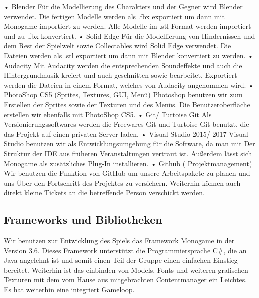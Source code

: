 \documentclass{article}
\begin{document}
• Blender\newline
Für die Modellierung des Charakters und der Gegner wird Blender verwendet.
Die fertigen Modelle werden als .fbx exportiert um dann mit Monogame importiert zu
werden. Alle Modelle im .stl Format werden importiert und zu .fbx konvertiert.\newline
• Solid Edge\newline
Für die Modellierung von Hindernissen und dem Rest der Spielwelt sowie
Collectables wird Solid Edge verwendet. Die Dateien werden als .stl exportiert um
dann mit Blender konvertiert zu werden.\newline
• Audacity\newline
Mit Audacity werden die entsprechenden Soundeffekte und auch die
Hintergrundmusik kreiert und auch geschnitten sowie bearbeitet. Exportiert
werden die Dateien in einem Format, welches von Audacity angenommen wird.\newline
• PhotoShop CS5 (Sprites, Textures, GUI, Menü)\newline
Photoshop benutzen wir zum Erstellen der Sprites sowie der Texturen und des
Menüs. Die Benutzeroberfläche erstellen wir ebenfalls mit PhotoShop CS5.\newline
• Git/ Turtoise Git\newline
Als Versionierungssoftwares werden die Freewares Git und Turtoise Git benutzt,
die das Projekt auf einen privaten Server laden.
• Visual Studio 2015/ 2017\newline
Visual Studio benutzen wir als Entwicklungsumgebung für die Software, da man mit
Der Struktur der IDE aus früheren Veranstaltungen vertraut ist. Außerdem lässt sich
Monogame als zusätzliches Plug-In installieren.\newline
• Github ( Projektmanagement)\newline
Wir benutzen die Funktion von GitHub um unsere Arbeitspakete zu planen und uns
Über den Fortschritt des Projektes zu versichern. Weiterhin können auch direkt kleine
Tickets an die betreffende Person verschickt werden.

\vspace{2cm}

\subsection{Frameworks und Bibliotheken}


Wir benutzen zur Entwicklung des Spiels das Framework Monogame in der Version 3.6.
Dieses Framework unterstützt die Programmiersprache C\#, die an Java angelehnt ist und somit
einen Teil der Gruppe einen einfachen Einstieg bereitet. Weiterhin ist das einbinden von Models,
Fonts und weiteren grafischen Texturen mit dem vom Hause aus mitgebrachten
Contentmanager ein Leichtes. Es hat weiterhin eine integriert Gameloop. \newline
\end{document}
